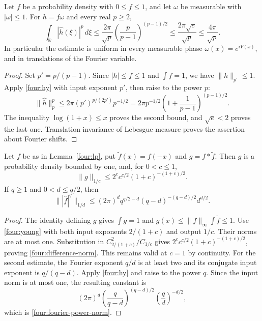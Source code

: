 \begin{lemma}\label{four:lp}
Let \(f\) be a probability density with \(0\leq f\leq1\), and let
\(\omega\) be measurable with \(|\omega|\leq1\).
For \(h=f\omega\) and every real \(p\geq2\),
\begin{equation}\label{four:lp-sharp}
 \int_{\mathbb R}|\widehat h(\xi)|^p\,d\xi
 \leq \frac{2\pi}{\sqrt p}
       \left(\frac{p}{p-1}\right)^{(p-1)/2}
 \leq\frac{2\pi\sqrt e}{\sqrt p}
 \leq\frac{4\pi}{\sqrt p}.
\end{equation}
In particular the estimate is uniform in every measurable phase
\(\omega(x)=e^{iV(x)}\), and in translations of the Fourier variable.
\end{lemma}
\begin{proof}
Set \(p'=p/(p-1)\).  Since \(|h|\leq f\leq1\) and
\(\int f=1\), we have \(\|h\|_{p'}\leq1\).  Apply
\eqref{four:hy} with input exponent \(p'\), then raise to the
power \(p\):
\[
 \|\widehat h\|_p^p
 \leq2\pi(p')^{p/(2p')}p^{-1/2}
 =2\pi p^{-1/2}
       \left(1+\frac1{p-1}\right)^{(p-1)/2}.
\]
The inequality \(\log(1+x)\leq x\) proves the second bound, and
\(\sqrt e<2\) proves the last one.  Translation invariance of Lebesgue
measure proves the assertion about Fourier shifts.
\end{proof}

\begin{lemma}\label{four:scalar-norms}
Let \(f\) be as in Lemma~\ref{four:lp}, put
\(\widetilde f(x)=f(-x)\) and \(g=f*\widetilde f\).  Then
\(g\) is a probability density bounded by one, and, for \(0<c\leq1\),
\begin{equation}\label{four:difference-norm}
 \|g\|_{1/c}\leq
 2^c c^{c/2}(1+c)^{-(1+c)/2}.
\end{equation}
If \(q\geq1\) and \(0<d\leq q/2\), then
\begin{equation}\label{four:fourier-power-norm}
 \big\||\widehat f|^q\big\|_{1/d}
 \leq (2\pi)^d q^{q/2-d}(q-d)^{-(q-d)/2}d^{d/2}.
\end{equation}
\end{lemma}
\begin{proof}
The identity defining \(g\) gives \(\int g=1\) and
\(g(x)\leq\|f\|_\infty\int\widetilde f\leq1\).
Use \eqref{four:young} with both input exponents \(2/(1+c)\)
and output \(1/c\).  Their norms are at most one.  Substitution in
\(C_{2/(1+c)}^2/C_{1/c}\) gives
\(2^cc^{c/2}(1+c)^{-(1+c)/2}\), proving
\eqref{four:difference-norm}.  This remains valid at \(c=1\) by
continuity.
For the second estimate, the Fourier exponent \(q/d\) is at least
two and its conjugate input exponent is \(q/(q-d)\).  Apply
\eqref{four:hy} and raise to the power \(q\).  Since the input
norm is at most one, the resulting constant is
\[
 (2\pi)^d
 \left(\frac q{q-d}\right)^{(q-d)/2}
 \left(\frac qd\right)^{-d/2},
\]
which is \eqref{four:fourier-power-norm}.
\end{proof}

